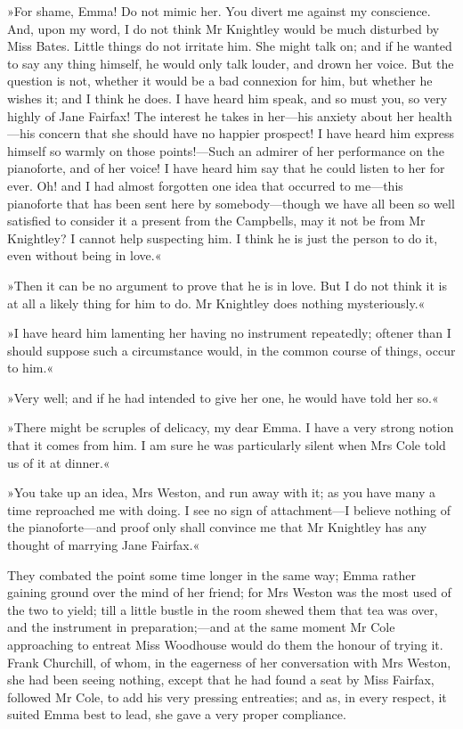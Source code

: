 »For shame, Emma! Do not mimic her. You divert me against my conscience. And, upon my word, I do not think Mr Knightley would be much disturbed by Miss Bates. Little things do not irritate him. She might talk on; and if he wanted to say any thing himself, he would only talk louder, and drown her voice. But the question is not, whether it would be a bad connexion for him, but whether he wishes it; and I think he does. I have heard him speak, and so must you, so very highly of Jane Fairfax! The interest he takes in her—his anxiety about her health—his concern that she should have no happier prospect! I have heard him express himself so warmly on those points!—Such an admirer of her performance on the pianoforte, and of her voice! I have heard him say that he could listen to her for ever. Oh! and I had almost forgotten one idea that occurred to me—this pianoforte that has been sent here by somebody—though we have all been so well satisfied to consider it a present from the Campbells, may it not be from Mr Knightley? I cannot help suspecting him. I think he is just the person to do it, even without being in love.«

»Then it can be no argument to prove that he is in love. But I do not think it is at all a likely thing for him to do. Mr Knightley does nothing mysteriously.«

»I have heard him lamenting her having no instrument repeatedly; oftener than I should suppose such a circumstance would, in the common course of things, occur to him.«

»Very well; and if he had intended to give her one, he would have told her so.«

»There might be scruples of delicacy, my dear Emma. I have a very strong notion that it comes from him. I am sure he was particularly silent when Mrs Cole told us of it at dinner.«

»You take up an idea, Mrs Weston, and run away with it; as you have many a time reproached me with doing. I see no sign of attachment—I believe nothing of the pianoforte—and proof only shall convince me that Mr Knightley has any thought of marrying Jane Fairfax.«

They combated the point some time longer in the same way; Emma rather gaining ground over the mind of her friend; for Mrs Weston was the most used of the two to yield; till a little bustle in the room shewed them that tea was over, and the instrument in preparation;—and at the same moment Mr Cole approaching to entreat Miss Woodhouse would do them the honour of trying it. Frank Churchill, of whom, in the eagerness of her conversation with Mrs Weston, she had been seeing nothing, except that he had found a seat by Miss Fairfax, followed Mr Cole, to add his very pressing entreaties; and as, in every respect, it suited Emma best to lead, she gave a very proper compliance.

